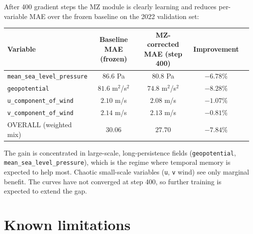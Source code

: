 \documentclass[11pt,a4paper]{article}
\begin{document}
After 400 gradient steps the MZ module is clearly learning and reduces per-variable MAE over the frozen baseline on the 2022 validation set:
\begin{table}[H]
\centering
\small
\begin{tabular}{lcccr}
\toprule
Variable & Baseline MAE (frozen) & MZ-corrected MAE (step 400) & Improvement \\
\midrule
\texttt{mean\_sea\_level\_pressure}  & $86.6$ Pa       & $80.8$ Pa       & $-6.78\%$ \\
\texttt{geopotential}                & $81.6$ m$^2$/s$^2$ & $74.8$ m$^2$/s$^2$ & $-8.28\%$ \\
\texttt{u\_component\_of\_wind}      & $2.10$ m/s      & $2.08$ m/s      & $-1.07\%$ \\
\texttt{v\_component\_of\_wind}      & $2.14$ m/s      & $2.13$ m/s      & $-0.81\%$ \\
\midrule
OVERALL (weighted mix)               & $30.06$         & $27.70$         & $-7.84\%$ \\
\bottomrule
\end{tabular}
\end{table}

The gain is concentrated in large-scale, long-persistence fields (\texttt{geopotential}, \texttt{mean\_sea\_level\_pressure}), which is the regime where temporal memory is expected to help most. Chaotic small-scale variables (\texttt{u}, \texttt{v} wind) see only marginal benefit. The curves have not converged at step 400, so further training is expected to extend the gap.

\section{Known limitations}
\end{document}
